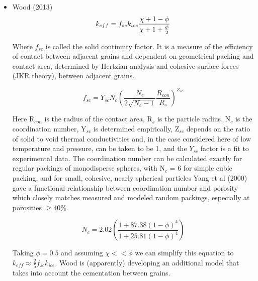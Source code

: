 \documentclass[11pt]{article} %
\begin{document}
	\begin{itemize}
	\item Wood (2013)
		\begin{equation}
		k_{eff}  = f_{sc} k_{ice} \frac{\chi + 1 - \phi}{\chi + 1 + \frac{\phi}{2}} \\
		\end{equation}
		
		Where $f_{sc}$ is called the solid continuity factor. It is a measure of the efficiency of contact between adjacent grains and dependent on geometrical packing and contact area, determined by Hertzian analysis and cohesive surface forces (JKR theory), between adjacent grains.
		
		\begin{equation}
		f_{sc} = Y_{sc}N_{c} \left( \frac{N_{c}}{2\sqrt{N_{c}-1}} \frac{R_{con}}{R_{s}} \right)^{Z_{sc}}
		\end{equation}
	
	Here R$_{con}$ is the radius of the contact area, R$_{s}$ is the particle radius, N$_{c}$ is the coordination number, Y$_{sc}$ is determined empirically, Z$_{sc}$ depends on the ratio of solid to void thermal conductivities and, in the case considered here of low temperature and pressure, can be taken to be 1, and the $Y_{sc}$ factor is a fit to experimental data. The coordination number can be calculated exactly for regular packings of monodisperse spheres, with N$_{c}$ = 6 for simple cubic packing, and for small, cohesive, nearly spherical particles Yang et al (2000) gave a functional relationship between coordination number and porosity which closely matches measured and modeled random packings, especially at porosities $\ge$40\%. 
	
	\begin{equation}
	N_{c} = 2.02 \left( \frac{1+87.38(1-\phi)^{4}}{1+25.81(1-\phi)^{4}} \right)
	\end{equation}
		
	Taking $\phi = 0.5$ and assuming $\chi << \phi$ we can simplify this equation to $k_{eff} \approx \frac{2}{5} f_{sc} k_{ice}$. Wood is (apparently) developing an additional model that takes into account the cementation between grains. 
		


\end{itemize}
\end{document}
